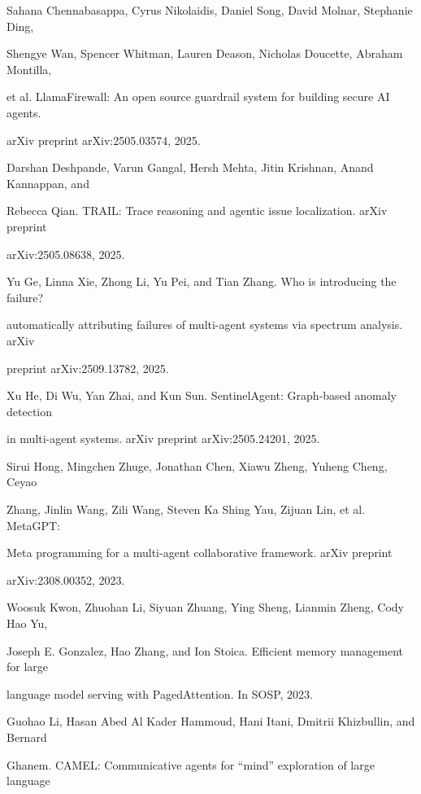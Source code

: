 \begin{flushleft}
\noindent  [9] Sahana Chennabasappa, Cyrus Nikolaidis, Daniel Song, David Molnar, Stephanie Ding,\par
\noindent  Shengye Wan, Spencer Whitman, Lauren Deason, Nicholas Doucette, Abraham Montilla,\par
\noindent  et al. LlamaFirewall: An open source guardrail system for building secure AI agents.\par
\noindent  arXiv preprint arXiv:2505.03574, 2025.\par
\noindent [10] Darshan Deshpande, Varun Gangal, Hersh Mehta, Jitin Krishnan, Anand Kannappan, and\par
\noindent  Rebecca Qian. TRAIL: Trace reasoning and agentic issue localization. arXiv preprint\par
\noindent  arXiv:2505.08638, 2025.\par
\noindent [11] Yu Ge, Linna Xie, Zhong Li, Yu Pei, and Tian Zhang. Who is introducing the failure?\par
\noindent  automatically attributing failures of multi-agent systems via spectrum analysis. arXiv\par
\noindent  preprint arXiv:2509.13782, 2025.\par
\noindent [12] Xu He, Di Wu, Yan Zhai, and Kun Sun. SentinelAgent: Graph-based anomaly detection\par
\noindent  in multi-agent systems. arXiv preprint arXiv:2505.24201, 2025.\par
\noindent [13] Sirui Hong, Mingchen Zhuge, Jonathan Chen, Xiawu Zheng, Yuheng Cheng, Ceyao\par
\noindent  Zhang, Jinlin Wang, Zili Wang, Steven Ka Shing Yau, Zijuan Lin, et al. MetaGPT:\par
\noindent  Meta programming for a multi-agent collaborative framework. arXiv preprint\par
\noindent  arXiv:2308.00352, 2023.\par
\noindent [14] Woosuk Kwon, Zhuohan Li, Siyuan Zhuang, Ying Sheng, Lianmin Zheng, Cody Hao Yu,\par
\noindent  Joseph E. Gonzalez, Hao Zhang, and Ion Stoica. Efficient memory management for large\par
\noindent  language model serving with PagedAttention. In SOSP, 2023.\par
\noindent [15] Guohao Li, Hasan Abed Al Kader Hammoud, Hani Itani, Dmitrii Khizbullin, and Bernard\par
\noindent  Ghanem. CAMEL: Communicative agents for “mind” exploration of large language\par

\end{flushleft}
